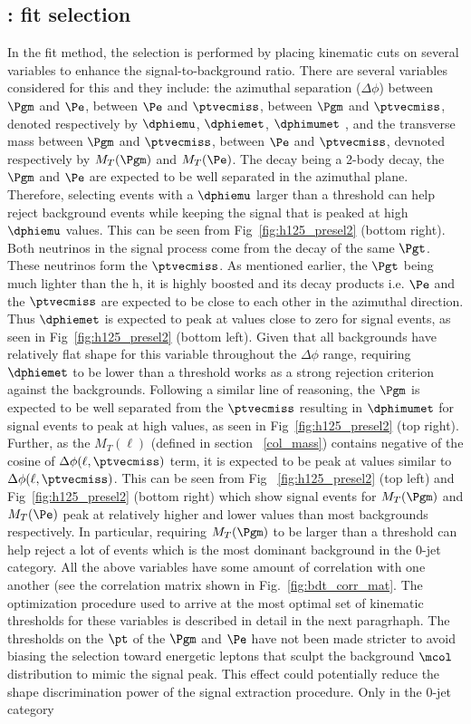 \subsection{\hmue: \mcol fit selection}
\label{h125_cb_sel}
In the \mcol fit method, the selection is performed by placing kinematic cuts on several variables to enhance the signal-to-background ratio. There are several variables considered for this and they include: the azimuthal separation ($\Delta\phi$) between $\Pgm$ and $\Pe$, between $\Pe$ and $\ptvecmiss$, between $\Pgm$ and $\ptvecmiss$, denoted respectively by $\dphiemu$, $\dphiemet$, $\dphimumet$ , and the transverse mass between $\Pgm$ and $\ptvecmiss$, between $\Pe$ and $\ptvecmiss$, devnoted respectively by $M_T(\Pgm)$ and $M_T(\Pe)$. The \hmue decay being a 2-body decay, the $\Pgm$ and $\Pe$ are expected to be well separated in the azimuthal plane. Therefore, selecting events with a $\dphiemu$ larger than a threshold can help reject background events while keeping the signal that is peaked at high $\dphiemu$ values. This can be seen from Fig~\ref{fig:h125_presel2} (bottom right). Both neutrinos in the signal process come from the decay of the same $\Pgt$. These neutrinos form the $\ptvecmiss$. As mentioned earlier, the $\Pgt$ being much lighter than the h, it is highly boosted and its decay products i.e. $\Pe$ and the $\ptvecmiss$ are expected to be close to each other in the azimuthal direction. Thus $\dphiemet$ is expected to peak at values close to zero for signal events, as seen in Fig~\ref{fig:h125_presel2} (bottom left). Given that all backgrounds have relatively flat shape for this variable  throughout the $\Delta\phi$ range, requiring $\dphiemet$ to be lower than a threshold works as a strong rejection criterion against the backgrounds. Following a similar line of reasoning, the $\Pgm$ is expected to be well separated from the $\ptvecmiss$ resulting in $\dphimumet$ for signal events to peak at high values, as seen in Fig~\ref{fig:h125_presel2} (top right). Further, as the $M_T(\ell)$ (defined in section ~\ref{col_mass}) contains negative of the cosine of $\Delta\phi(\ell, \ptvecmiss)$ term, it is expected to be peak at values similar to $\Delta\phi(\ell, \ptvecmiss)$. This can be seen from Fig ~\ref{fig:h125_presel2} (top left) and Fig~\ref{fig:h125_presel2} (bottom right) which show signal events for $M_T(\Pgm)$ and $M_T(\Pe)$ peak at relatively higher and lower values than most backgrounds respectively. In particular, requiring $M_T(\Pgm)$ to be larger than a threshold can help reject a lot of \ztt events which is the most dominant background in the 0-jet category. All the above variables have some amount of correlation with one another (see the correlation matrix shown in Fig.~\ref{fig:bdt_corr_mat}. The optimization procedure used to arrive at the most optimal set of kinematic thresholds for these variables is described in detail in the next paragrhaph. The thresholds on the $\pt$ of the $\Pgm$ and $\Pe$ have not been made stricter to avoid biasing the selection toward energetic leptons that sculpt the background $\mcol$ distribution to mimic the signal peak. This effect could potentially reduce the shape discrimination power of the signal extraction procedure. Only in the 0-jet category 
